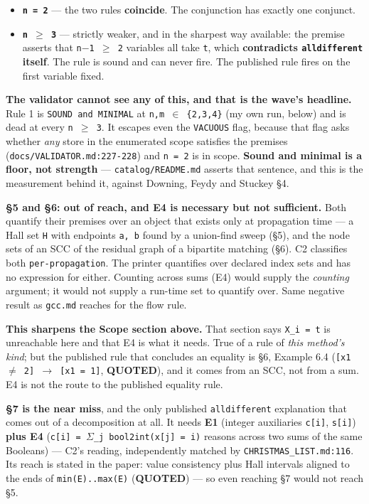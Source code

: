 \documentclass[10pt,a4paper]{article}
\newcommand{\provtag}[2]{{\small\sffamily\bfseries\textcolor{#1}{#2}}}
\newenvironment{calblock}{%
  \par\smallskip
  \def\FrameCommand{\textcolor{calbar}{\vrule width 1pt}\hspace{9pt}}%
  \MakeFramed{\advance\hsize-\width\FrameRestore}}%
  {\endMakeFramed\par\smallskip}
\begin{document}
\begin{calblock}
\begin{itemize}\setlength{\itemsep}{0pt}
\item \textbf{\texttt{n = 2}} --- the two rules \textbf{coincide}. The conjunction has exactly one conjunct.
\item \textbf{\texttt{n $\geq$ 3}} --- strictly weaker, and in the sharpest way available: the premise asserts that \texttt{n$-$1 $\geq$ 2} variables all take \texttt{t}, which \textbf{contradicts \texttt{alldifferent} itself}. The rule is sound and can never fire. The published rule fires on the first variable fixed.
\end{itemize}
\textbf{The validator cannot see any of this, and that is the wave's headline.} Rule 1 is \texttt{SOUND and MINIMAL} at \texttt{n,m $\in$ \{2,3,4\}} (my own run, below) and is dead at every \texttt{n $\geq$ 3}. It escapes even the \texttt{VACUOUS} flag, because that flag asks whether \emph{any} store in the enumerated scope satisfies the premises (\texttt{docs/\allowbreak{}VALIDATOR.\allowbreak{}md:227-\allowbreak{}228}) and \texttt{n = 2} is in scope. \textbf{Sound and minimal is a floor, not strength} --- \texttt{catalog/README.md} asserts that sentence, and this is the measurement behind it, against Downing, Feydy and Stuckey \S{}4.

\textbf{\S{}5 and \S{}6: out of reach, and E4 is necessary but not sufficient.} Both quantify their premises over an object that exists only at propagation time --- a Hall set \texttt{H} with endpoints \texttt{a, b} found by a union-find sweep (\S{}5), and the node sets of an SCC of the residual graph of a bipartite matching (\S{}6). C2 classifies both \texttt{per-propagation}. The printer quantifies over declared index sets and has no expression for either. Counting across sums (E4) would supply the \emph{counting} argument; it would not supply a run-time set to quantify over. Same negative result as \texttt{gcc.md} reaches for the flow rule.

\textbf{This sharpens the Scope section above.} That section says \texttt{X\_i = t} is unreachable here and that E4 is what it needs. True of a rule of \emph{this method's kind}; but the published rule that concludes an equality is \S{}6, Example 6.4 (\texttt{[x1 $\neq$ 2] $\rightarrow$ [x1 = 1]}, \provtag{tagquoted}{QUOTED}), and it comes from an SCC, not from a sum. E4 is not the route to the published equality rule.

\textbf{\S{}7 is the near miss}, and the only published \texttt{alldifferent} explanation that comes out of a decomposition at all. It needs \textbf{E1} (integer auxiliaries \texttt{c[i]}, \texttt{s[i]}) \textbf{plus E4} (\texttt{c[i] = $\Sigma$\_\allowbreak{}j bool2int(x[j] = i)} reasons across two sums of the same Booleans) --- C2's reading, independently matched by \texttt{CHRISTMAS\_LIST.md:116}. Its reach is stated in the paper: value consistency plus Hall intervals aligned to the ends of \texttt{min(E)..max(E)} (\provtag{tagquoted}{QUOTED}) --- so even reaching \S{}7 would not reach \S{}5.


\end{calblock}
\end{document}
